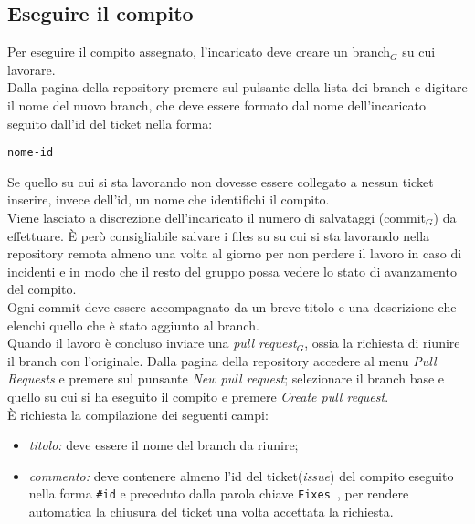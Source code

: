 \subsection{Eseguire il compito}
Per eseguire il compito assegnato, l'incaricato deve creare un branch$_{G}$ su cui lavorare. \\
Dalla pagina della repository premere sul pulsante della lista dei branch e digitare il nome del nuovo branch, che deve essere formato dal nome dell'incaricato seguito dall'id del ticket nella forma: 
\begin{verbatim}
nome-id
\end{verbatim}
Se quello su cui si sta lavorando non dovesse essere collegato a nessun ticket inserire, invece dell'id, un nome che identifichi il compito. \\
Viene lasciato a discrezione dell'incaricato il numero di salvataggi (commit$_{G}$) da effettuare. È però consigliabile salvare i files su su cui si sta lavorando nella repository remota almeno una volta al giorno per non perdere il lavoro in caso di incidenti e in modo che il resto del gruppo possa vedere lo stato di avanzamento del compito. \\
Ogni commit deve essere accompagnato da un breve titolo e una descrizione che elenchi quello che è stato aggiunto al branch. \\
Quando il lavoro è concluso inviare una \textit{pull request}$_{G}$, ossia la richiesta di riunire il branch con l'originale. Dalla pagina della repository accedere al menu \textit{Pull Requests} e premere sul punsante \textit{New pull request}; selezionare il branch base e quello su cui si ha eseguito il compito e premere \textit{Create pull request}.\\ È richiesta la compilazione dei seguenti campi:
\begin{itemize}
    \item \textit{titolo:} deve essere il nome del branch da riunire;
    \item \textit{commento:} deve contenere almeno l'id del ticket(\textit{issue}) del compito eseguito nella forma \texttt{\#id} e preceduto dalla parola chiave \texttt{Fixes }, per rendere automatica la chiusura del ticket una volta accettata la richiesta. 
\end{itemize}

